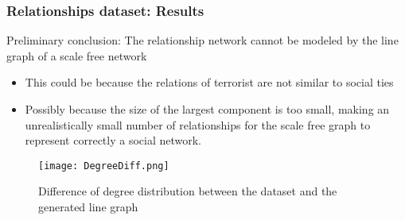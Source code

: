 
\begin{frame}
\frametitle{Relationships dataset: Results}


Preliminary conclusion: The relationship network cannot be modeled by the line graph of a scale free network
\begin{itemize}
\item This could be because the relations of terrorist are not similar to social ties
\item Possibly because the size of the largest component is too small, making an unrealistically small number of relationships for the scale free graph to represent correctly a social network.
\end{itemize}


\begin{figure}[H]
\begin{center}
\texttt{[image: DegreeDiff.png]}
\caption{Difference of degree distribution between the dataset and the generated line graph}
\label{fig:degdiff}
\end{center}
\end{figure}

\end{frame}

